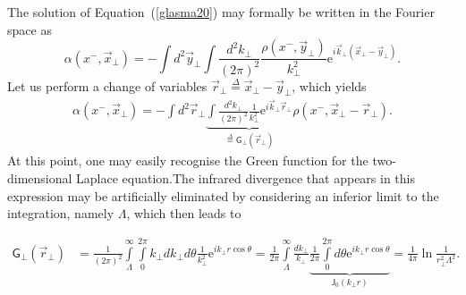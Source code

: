 \begin{note}
    The solution of Equation~(\cref{glasma20}) may formally be written in the Fourier space as
    \begin{equation*}
        \alpha(x^-,\vec{x}_\perp)=-\int d^2\vec{y}_\perp\int \frac{d^2k_\perp}{(2\pi)^2}\frac{\rho(x^-,\vec{y}_\perp)}{k_\perp^2}\mathrm{e}^{i\vec{k}_\perp\left(\vec{x}_\perp-\vec{y}_\perp\right)}.
    \end{equation*}
    Let us perform a change of variables $\vec{r}_\perp\overset{\Delta}{=}\vec{x}_\perp-\vec{y}_\perp$, which yields
    \begin{align*}
    \alpha(x^-,\vec{x}_\perp)=-\int d^2\vec{r}_\perp\underbrace{\int \frac{d^2k_\perp}{(2\pi)^2}\frac{1}{k_\perp^2}\mathrm{e}^{i\vec{k}_\perp\vec{r}_\perp}}_{\overset{\Delta}{=}\textsf{G}_\perp(\vec{r}_\perp)}\rho(x^-,\vec{x}_\perp-\vec{r}_\perp).
    \end{align*}
    At this point, one may easily recognise the Green function for the two-dimensional Laplace equation.The infrared divergence that appears in this expression may be artificially eliminated by considering an inferior limit to the integration, namely $\Lambda$, which then leads to
    \begin{fullwidth}
    \begin{equation*}
        \begin{aligned}
        \textsf{G}_\perp(\vec{r}_\perp)&=\frac{1}{(2\pi)^2}\int\limits_\Lambda^\infty\int\limits_0^{2\pi}k_\perp dk_\perp d\theta\frac{1}{k_\perp^2}\mathrm{e}^{ik_\perp r \cos\theta}=\frac{1}{2\pi}\int\limits_\Lambda^\infty\frac{dk_\perp}{k_\perp}\underbrace{\frac{1}{2\pi}\int\limits_0^{2\pi}d\theta \mathrm{e}^{ik_\perp r\cos\theta}}_{\textsf{J}_0(k_\perp r)}=\frac{1}{4\pi}\ln{\frac{1}{r_\perp^2\Lambda^2}}.
        \end{aligned}
    \end{equation*}    
    \end{fullwidth}
\end{note}


